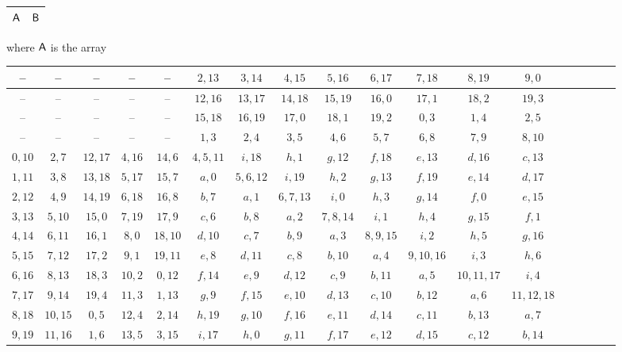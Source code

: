 \documentclass[draft, 11pt]{article}
\begin{document}
\begin{figure}[h!]
\renewcommand{\arraystretch}{2}
 \setlength{\tabcolsep}{10pt} \centering \Large
\begin{tabular}{|c|c|}
\hline 
${\sf A}$ & ${\sf B}$\\
\hline
\end{tabular}

\vskip 5pt
\normalsize \flushleft where ${\sf A}$ is the array
\vskip 5pt

\renewcommand{\arraystretch}{1.2}
 \setlength\tabcolsep{1pt}
 \centering
 \small
\begin{tabular}{|c|c|c| c|c|c| c|c|c| c|c|c| c|c|c| c|c|c| }
\hline
-- & -- & -- & -- & -- & $2,13$ & $3,14$ & $4,15$ & $5,16$ & $6,17$ & $7,18$ & $8,19$ & $9,0$ \\\hline
-- & -- & -- & -- & -- & $12,16$ & $13,17$ & $14,18$ & $15,19$ & $16,0$ & $17,1$ & $18,2$ & $19,3$ \\\hline
-- & -- & -- & -- & -- & $15,18$ & $16,19$ & $17,0$ & $18,1$ & $19,2$ & $0,3$ & $1,4$ & $2,5$ \\\hline
-- & -- & -- & -- & -- & $1,3$ & $2,4$ & $3,5$ & $4,6$ & $5,7$ & $6,8$ & $7,9$ & $8,10$ \\\hline
$0,10$ & $2,7$ & $12,17$ & $4,16$ & $14,6$ & $4,5,11$ & $i,18$ & $h,1$ & $g,12$ & $f,18$ & $e,13$ & $d,16$ & $c,13$ \\\hline
$1,11$ & $3,8$ & $13,18$ & $5,17$ & $15,7$ & $a,0$ & $5,6,12$ & $i,19$ & $h,2$ & $g,13$ & $f,19$ & $e,14$ & $d,17$ \\\hline
$2,12$ & $4,9$ & $14,19$ & $6,18$ & $16,8$ & $b,7$ & $a,1$ & $6,7,13$ & $i,0$ & $h,3$ & $g,14$ & $f,0$ & $e,15$ \\\hline
$3,13$ & $5,10$ & $15,0$ & $7,19$ & $17,9$ & $c,6$ & $b,8$ & $a,2$ & $7,8,14$ & $i,1$ & $h,4$ & $g,15$ & $f,1$ \\\hline
$4,14$ & $6,11$ & $16,1$ & $8,0$ & $18,10$ & $d,10$ & $c,7$ & $b,9$ & $a,3$ & $8,9,15$ & $i,2$ & $h,5$ & $g,16$ \\\hline
$5,15$ & $7,12$ & $17,2$ & $9,1$ & $19,11$ & $e,8$ & $d,11$ & $c,8$ & $b,10$ & $a,4$ & $9,10,16$ & $i,3$ & $h,6$ \\\hline
$6,16$ & $8,13$ & $18,3$ & $10,2$ & $0,12$ & $f,14$ & $e,9$ & $d,12$ & $c,9$ & $b,11$ & $a,5$ & $10,11,17$ & $i,4$ \\\hline
$7,17$ & $9,14$ & $19,4$ & $11,3$ & $1,13$ & $g,9$ & $f,15$ & $e,10$ & $d,13$ & $c,10$ & $b,12$ & $a,6$ & $11,12,18$ \\\hline
$8,18$ & $10,15$ & $0,5$ & $12,4$ & $2,14$ & $h,19$ & $g,10$ & $f,16$ & $e,11$ & $d,14$ & $c,11$ & $b,13$ & $a,7$ \\\hline
$9,19$ & $11,16$ & $1,6$ & $13,5$ & $3,15$ & $i,17$ & $h,0$ & $g,11$ & $f,17$ & $e,12$ & $d,15$ & $c,12$ & $b,14$ \\\hline
\end{tabular}


\end{figure}
\end{document}
